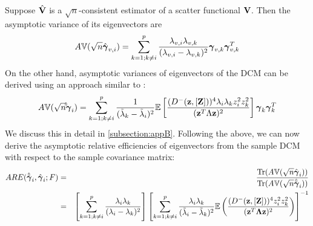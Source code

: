 Suppose $\hat {{\mathbf{V}}}$ is a $\sqrt n$-consistent estimator of a scatter functional ${\mathbf{V}}$. Then the asymptotic variance of its eigenvectors are \citep{anderson}
%
\begin{equation} \label{equation:covevEq}
A{\mathbb{V}}(\sqrt n\hat {{\boldsymbol{\gamma}}}_{v,i}) = \sum_{k=1; k \neq i}^p \frac{\lambda_{v,i} \lambda_{v,k}}{(\lambda_{v,i} - \lambda_{v,k})^2} {\boldsymbol{\gamma}}_{v,k} {\boldsymbol{\gamma}}_{v,k}^T
\end{equation}
%
On the other hand, asymptotic variances of eigenvectors of the DCM can be derived using an approach similar to \cite{taskinen12}:
%
\begin{equation} \label{equation:dcmevEq}
A{\mathbb{V}}( \sqrt n\hat \tilde {{\boldsymbol{\gamma}}}_{i} ) = \sum_{k=1; k \neq i}^p \frac{1}{(\tilde \lambda_k - \tilde \lambda_i)^2} {\mathbb{E}} \left[ \frac{(D^- ({\bf{z}}, [{\mathbf{Z}}]))^4 \lambda_i \lambda_k z_i^2 z_k^2}{({\bf{z}}^T \Lambda {\bf{z}})^2} \right] {\boldsymbol{\gamma}}_k {\boldsymbol{\gamma}}_k^T
\end{equation}
%
We discuss this in detail in \ref{subsection:appB}. Following the above, we can now derive the asymptotic relative efficiencies of eigenvectors from the sample DCM with respect to the sample covariance matrix:
%
\begin{eqnarray*}
ARE(\hat{ \tilde{{\boldsymbol{\gamma}}}}_i, \hat{{\boldsymbol{\gamma}}}_i; F) &=& \frac{\operatorname*{Tr}( A{\mathbb{V}}(\sqrt n\hat {{\boldsymbol{\gamma}}}_i))}{\operatorname*{Tr}( A{\mathbb{V}}(\sqrt n \hat{ \tilde{{\boldsymbol{\gamma}}}}_i )) }\\
&=& \left[\sum_{k=1; k \neq i}^p \frac{\lambda_i \lambda_k }{ (\lambda_i - \lambda_k )^2 } \right] \left[ \sum_{k=1; k \neq i}^p \frac{ \lambda_i \lambda_k }{ ( \tilde\lambda_{i} - \tilde\lambda_{k})^2} {\mathbb{E}} \left( \frac{ ( D^- ({\bf{z}}, [{\mathbf{Z}}]) )^4 z_i^2 z_k^2}{({\bf{z}}^T {\boldsymbol{\Lambda}} {\bf{z}})^2} \right) \right]^{-1}
\end{eqnarray*}

